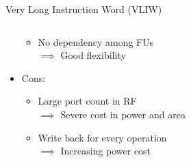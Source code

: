 \documentclass{beamer}
\begin{document}
\begin{CJK}{UTF8}{bkai}
\begin{frame}{Very Long Instruction Word (VLIW)}
\begin{columns}
\begin{column}{0.6\textwidth}
\begin{itemize}
{\begin{itemize}
                                        \item No dependency among FUs \\ $\implies$ Good flexibility
                                    \end{itemize}
                                }
                            \item <4-> {Cons:
                                    \begin{itemize}
                                        \item Large port count in RF \\ $\implies$ Severe cost in power and area
                                        \item Write back for every operation \\ $\implies$ Increasing power cost
                                    \end{itemize}
                                }
                        \end{itemize} 
                    \end{column}
                \end{columns} 
            \end{frame}


\end{CJK}
\end{document}

